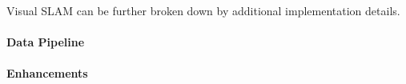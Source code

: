 Visual SLAM can be further broken down by additional implementation details.


\paragraph{Data Pipeline}

\paragraph{Enhancements}